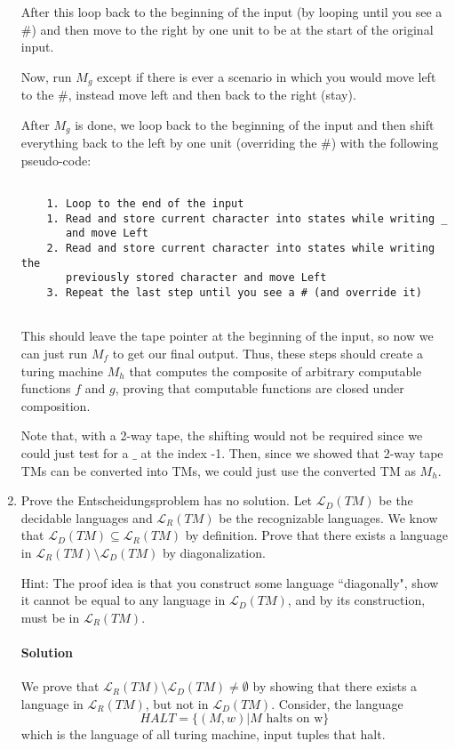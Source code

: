 \documentclass[11pt]{article}
\newcommand{\solution}[1]{\paragraph{Solution}  }
\begin{document}
\begin{enumerate}
    After this loop back to the beginning of the input (by looping until you see a #) and then move to the right by one unit to be at the start of the original input.

    Now, run $M_g$ except if there is ever a scenario in which you would move left to the #, instead move left and then back to the right (stay).

    After $M_g$ is done, we loop back to the beginning of the input and then shift everything back to the left by one unit (overriding the #) with the following pseudo-code:

    \begin{verbatim}

    1. Loop to the end of the input
    1. Read and store current character into states while writing _
       and move Left
    2. Read and store current character into states while writing the 
       previously stored character and move Left
    3. Repeat the last step until you see a # (and override it)
    
    \end{verbatim}

    This should leave the tape pointer at the beginning of the input, so now we can just run $M_f$ to get our final output. Thus, these steps should create a turing machine $M_h$ that computes the composite of arbitrary computable functions $f$ and $g$, proving that computable functions are closed under composition.

    Note that, with a 2-way tape, the shifting would not be required since we could just test for a $\_$ at the index -1. Then, since we showed that 2-way tape TMs can be converted into TMs, we could just use the converted TM as $M_h$.
    

    \item Prove the Entscheidungsproblem has no solution. Let $\mathscr{L}_D(TM)$ be the decidable languages and $\mathscr{L}_R(TM)$ be the recognizable languages. We know that $\mathscr{L}_D(TM) \subseteq \mathscr{L}_R(TM)$ by definition. Prove that there exists a language in $\mathscr{L}_R(TM) \setminus \mathscr{L}_D(TM)$ by diagonalization.

    Hint: The proof idea is that you construct some language ``diagonally", show it cannot be equal to any language in $\mathscr{L}_D(TM)$, and by its construction, must be in $\mathscr{L}_R(TM)$.

    \solution{} We prove that $\mathscr{L}_R(TM) \setminus \mathscr{L}_D(TM) \neq \emptyset$ by showing that there exists a language in $\mathscr{L}_R(TM)$, but not in $\mathscr{L}_D(TM)$. Consider, the language
    $$ HALT = \{ (M, w) | M \text{ halts on w} \} $$
    which is the language of all turing machine, input tuples that halt. 
    

\end{enumerate}
\end{document}
